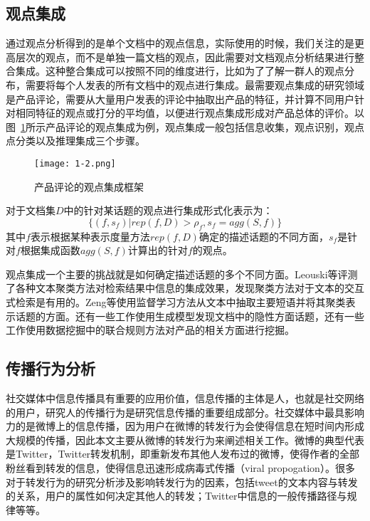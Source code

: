\subsection{观点集成}
\label{ch_integrate}
通过观点分析得到的是单个文档中的观点信息，实际使用的时候，我们关注的是更高层次的观点，而不是单独一篇文档的观点，因此需要对文档观点分析结果进行整合集成。这种整合集成可以按照不同的维度进行，比如为了了解一群人的观点分布，需要将每个人发表的所有文档中的观点进行集成。最需要观点集成的研究领域是产品评论，需要从大量用户发表的评论中抽取出产品的特征，并计算不同用户针对相同特征的观点或打分的平均值，以便进行观点集成形成对产品总体的评价。以图~\ref{fig1-2}所示产品评论的观点集成为例，观点集成一般包括信息收集，观点识别，观点点分类以及推理集成三个步骤。
\begin{figure}[htp]
\centering
\texttt{[image: 1-2.png]}
\caption{产品评论的观点集成框架}
\label{fig1-2}
\end{figure}

对于文档集$ D $中的针对某话题的观点进行集成形式化表示为：
\begin{equation}
\{(f,s_f)|rep(f,D)>\rho_f,s_f=agg(S,f)\}
\end{equation}
其中$ f $表示根据某种表示度量方法$ rep(f,D) $确定的描述话题的不同方面，$ s_f $是针对$ f $根据集成函数$ agg(S,f) $计算出的针对$ f $的观点。

观点集成一个主要的挑战就是如何确定描述话题的多个不同方面。Leouski等评测了各种文本聚类方法对检索结果中信息的集成效果，发现聚类方法对于文本的交互式检索是有用的。Zeng等使用监督学习方法从文本中抽取主要短语并将其聚类表示话题的方面。还有一些工作使用生成模型发现文档中的隐性方面话题，还有一些工作使用数据挖掘中的联合规则方法对产品的相关方面进行挖掘。

\subsection{传播行为分析}
\label{rel3}
社交媒体中信息传播具有重要的应用价值，信息传播的主体是人，也就是社交网络的用户，研究人的传播行为是研究信息传播的重要组成部分。社交媒体中最具影响力的是微博上的信息传播，因为用户在微博的转发行为会使得信息在短时间内形成大规模的传播，因此本文主要从微博的转发行为来阐述相关工作。微博的典型代表是Twitter，Twitter转发机制，即重新发布其他人发布过的微博，使得作者的全部粉丝看到转发的信息，使得信息迅速形成病毒式传播（viral propogation）。很多对于转发行为的研究分析涉及影响转发行为的因素，包括tweet的文本内容与转发的关系，用户的属性如何决定其他人的转发；Twitter中信息的一般传播路径与规律等等。


